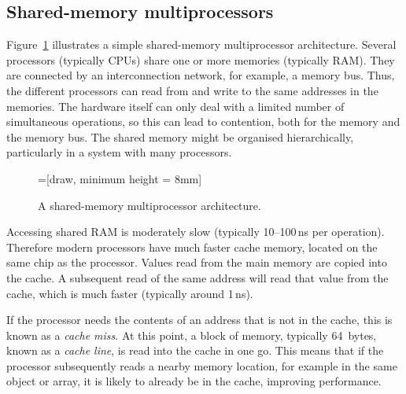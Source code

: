
\subsection{Shared-memory multiprocessors}

Figure~\ref{fig:multi-arch} illustrates a simple shared-memory multiprocessor
architecture.  Several processors (typically CPUs) share one or more memories
(typically RAM).  They are connected by an interconnection network, for
example, a memory bus.  Thus, the different processors can read from and write
to the same addresses in the memories.  The hardware itself can only deal with
a limited number of simultaneous operations, so this can lead to contention,
both for the memory and the memory bus.  The shared memory might be organised
hierarchically, particularly in a system with many processors.


\begin{figure}
=[draw, minimum height = 8mm]
\begin{center}
\end{center}
\caption{A shared-memory multiprocessor architecture.}
\label{fig:multi-arch}
\end{figure}

Accessing shared RAM is moderately slow (typically 10--100\,ns per operation).
Therefore modern processors have much faster cache memory, located on the same
chip as the processor.  Values read from the main memory are copied into the
cache.  A subsequent read of the same address will read that value from the
cache, which is much faster (typically around 1\,ns).

If the processor needs the contents of an address that is not in the cache,
this is known as a \emph{cache miss}.  At this point, a block of memory,
typically 64~bytes, known as a \emph{cache line}, is read into the cache in
one go.  This means that if the processor subsequently reads a nearby memory
location, for example in the same object or array, it is likely to already be
in the cache, improving performance.
  
